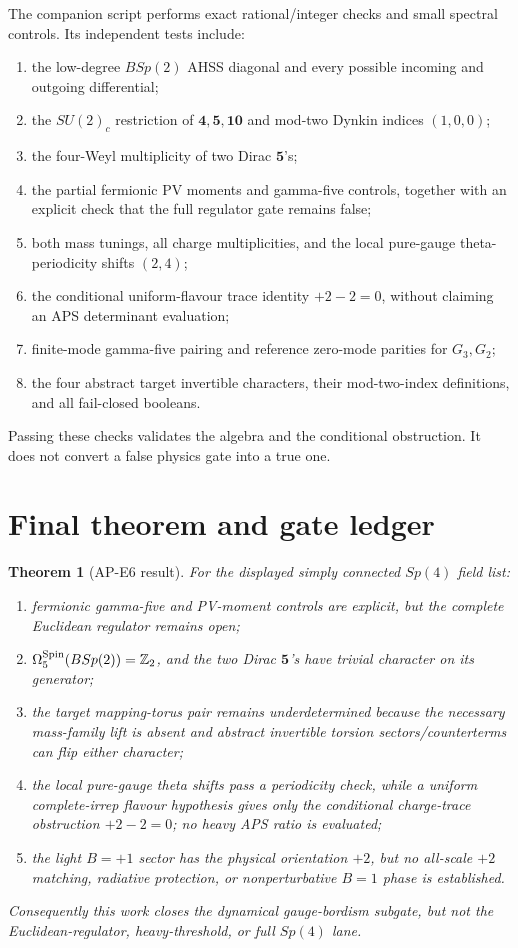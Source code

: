 \documentclass[11pt]{article}
\newtheorem{theorem}{Theorem}[section]
\theoremstyle{definition}
\theoremstyle{remark}
\newcommand{\ZZ}{\mathbb Z}
\begin{document}
The companion script performs exact rational/integer checks and small
spectral controls.  Its independent tests include:
\begin{enumerate}
\item the low-degree \(BSp(2)\) AHSS diagonal and every possible incoming
  and outgoing differential;
\item the \(SU(2)_c\) restriction of \(\bm4,\bm5,\bm{10}\) and mod-two
  Dynkin indices \((1,0,0)\);
\item the four-Weyl multiplicity of two Dirac \(\bm5\)'s;
\item the partial fermionic PV moments and gamma-five controls, together
  with an explicit check that the full regulator gate remains false;
\item both mass tunings, all charge multiplicities, and the local
  pure-gauge theta-periodicity shifts \((2,4)\);
\item the conditional uniform-flavour trace identity \(+2-2=0\), without
  claiming an APS determinant evaluation;
\item finite-mode gamma-five pairing and reference zero-mode parities for
  \(G_3,G_2\);
\item the four abstract target invertible characters, their mod-two-index
  definitions, and all fail-closed booleans.
\end{enumerate}
Passing these checks validates the algebra and the conditional obstruction.  It does
not convert a false physics gate into a true one.

\section{Final theorem and gate ledger}

\begin{theorem}[AP-E6 result]
For the displayed simply connected \(Sp(4)\) field list:
\begin{enumerate}
\item fermionic gamma-five and PV-moment controls are explicit, but the
  complete Euclidean regulator remains open;
\item \(\Omega_5^{\rm Spin}(BSp(2))=\ZZ_2\), and the two Dirac
  \(\bm5\)'s have trivial character on its generator;
\item the target mapping-torus pair remains underdetermined because the
  necessary mass-family lift is absent and abstract invertible torsion
  sectors/counterterms can flip either character;
\item the local pure-gauge theta shifts pass a periodicity check, while a
  uniform complete-irrep flavour hypothesis gives only the conditional
  charge-trace obstruction \(+2-2=0\); no heavy APS ratio is evaluated;
\item the light \(B=+1\) sector has the physical orientation \(+2\), but
  no all-scale \(+2\) matching, radiative protection, or nonperturbative
  \(B=1\) phase is established.
\end{enumerate}
Consequently this work closes the dynamical gauge-bordism subgate, but not
the Euclidean-regulator, heavy-threshold, or full \(Sp(4)\) lane.
\end{theorem}
\end{document}
